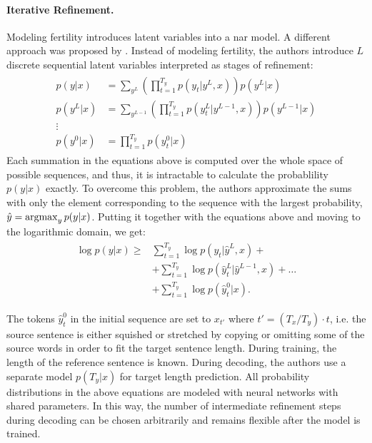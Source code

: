 \paragraph{Iterative Refinement.} Modeling fertility introduces latent
variables into a \acl{nar} model. A different approach was proposed by
\citet{lee-etal-2018-deterministic}. Instead of modeling fertility, the authors
introduce $L$ discrete sequential latent variables interpreted as stages of
refinement:
%
\begin{align}
  \begin{split}
    p(y|x) & = \sum_{y^L}
      \left( \prod_{t=1}^{T_y} p(y_t|y^L, x) \right) p(y^L|x) \\
    p(y^L|x) & = \sum_{y^{L-1}}
      \left( \prod_{t=1}^{T_y} p(y_t^L | y^{L-1}, x) \right)
      p(y^{L-1}|x) \\
    \vdots \\
    p(y^0|x) & = \prod_{t=1}^{T_y} p(y_t^0|x)
  \end{split}
\end{align}
%
Each summation in the equations above is computed over the whole space of
possible sequences, and thus, it is intractable to calculate the probablility
$p(y|x)$ exactly. To overcome this problem, the authors approximate the sums
with only the element corresponding to the sequence with the largest
probability, $\hat{y} = \operatorname*{argmax}_{y}p(y|x)$. Putting it together with the
equations above and moving to the logarithmic domain, we get:
\begin{align}
  \begin{split}
    \log p(y|x) \geq
    & \sum_{t=1}^{T_y} \log p(y_t| \hat{y}^L, x) + \\
    & + \sum_{t=1}^{T_y} \log p(\hat{y}_t^{L}| \hat{y}^{L-1}, x) + \ldots \\
    & + \sum_{t=1}^{T_y} \log p(\hat{y}_t^0 | x). \label{eq:refinement-lowerbound}
  \end{split}
\end{align}

The tokens $\hat{y}_t^0$ in the initial sequence are set to $x_{t'}$ where
$t' = (T_x / T_y) \cdot t$, i.e. the source sentence is either squished or
stretched by copying or omitting some of the source words in order to fit the
target sentence length. During training, the length of the reference sentence
is known. During decoding, the authors use a separate model $p(T_y|x)$ for
target length prediction. All probability distributions in the above equations
are modeled with neural networks with shared parameters. In this way, the
number of intermediate refinement steps during decoding can be chosen
arbitrarily and remains flexible after the model is trained.

